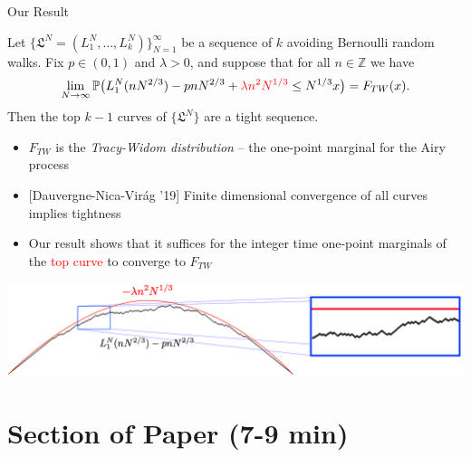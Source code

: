 \documentclass[9pt,t,dvipsnames]{beamer}
\begin{document}
\begin{frame}{Our Result}
\small{\begin{theorem}[DFFSTWZ] Let $\{\mathfrak{L}^N = (L_1^N,\dots,L_k^N)\}_{N=1}^\infty$ be a sequence of $k$ avoiding Bernoulli random walks. Fix $p\in(0,1)$ and $\lambda > 0$, and suppose that for all $n\in\mathbb{Z}$ we have
\[
\lim_{N\to\infty} \mathbb{P}\big(L_1^{N}(nN^{2/3}) - pnN^{2/3} + \textcolor{red}{\lambda n^2 N^{1/3}} \leq N^{1/3} x \big) = F_{TW}(x).
\]
Then the top $k-1$ curves of $\{\mathfrak{L}^N\}$ are a tight sequence.
\end{theorem}}

\begin{itemize}
	\item $F_{TW}$ is the \textit{Tracy-Widom distribution} -- the one-point marginal for the Airy process
	
	\item {[Dauvergne-Nica-Vir\'{a}g '19]} Finite dimensional convergence of all curves implies tightness
	
	\item Our result shows that it suffices for the integer time one-point marginals of the \textcolor{red}{top curve} to converge to $F_{TW}$
\end{itemize}
\begin{center}
	\includegraphics[width=\textwidth]{graphics/ConvToTW.png}
\end{center}
\end{frame}


\section{Section of Paper (7-9 min)}
\end{document}
